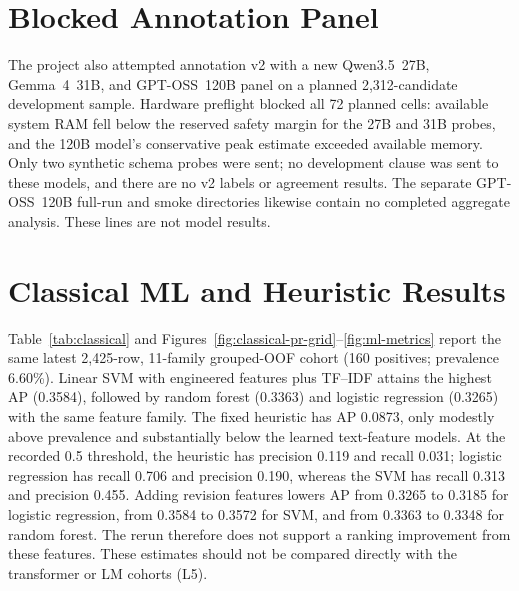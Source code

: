 \documentclass[12pt,a4paper,oneside]{report}
\begin{document}
\section{Blocked Annotation Panel}

The project also attempted annotation v2 with a new Qwen3.5~27B, Gemma~4~31B, and GPT-OSS~120B panel on a planned 2,312-candidate development sample. Hardware preflight blocked all 72 planned cells: available system RAM fell below the reserved safety margin for the 27B and 31B probes, and the 120B model's conservative peak estimate exceeded available memory. Only two synthetic schema probes were sent; no development clause was sent to these models, and there are no v2 labels or agreement results. The separate GPT-OSS~120B full-run and smoke directories likewise contain no completed aggregate analysis. These lines are not model results.

\section{Classical ML and Heuristic Results}
\label{sec:classical-results}

Table~\ref{tab:classical} and Figures~\ref{fig:classical-pr-grid}--\ref{fig:ml-metrics} report the same latest 2,425-row, 11-family grouped-OOF cohort (160 positives; prevalence 6.60\%). Linear SVM with engineered features plus TF--IDF attains the highest AP (0.3584), followed by random forest (0.3363) and logistic regression (0.3265) with the same feature family. The fixed heuristic has AP 0.0873, only modestly above prevalence and substantially below the learned text-feature models. At the recorded 0.5 threshold, the heuristic has precision 0.119 and recall 0.031; logistic regression has recall 0.706 and precision 0.190, whereas the SVM has recall 0.313 and precision 0.455. Adding revision features lowers AP from 0.3265 to 0.3185 for logistic regression, from 0.3584 to 0.3572 for SVM, and from 0.3363 to 0.3348 for random forest. The rerun therefore does not support a ranking improvement from these features. These estimates should not be compared directly with the transformer or LM cohorts (L5).
\end{document}
